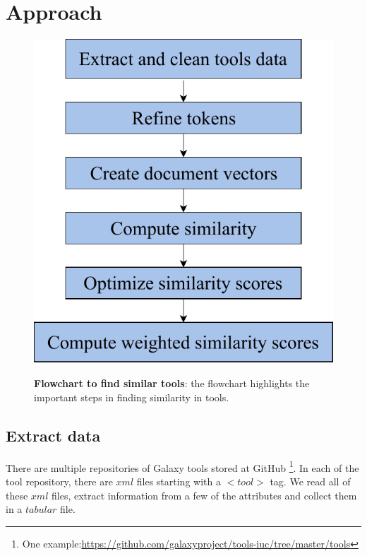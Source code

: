 \chapter{Approach}\label{chap:approach}

\begin{figure}[h]
\begin{centering}
    {\includegraphics[scale=0.7]{figures/tool_sim_flow.pdf}}
    \caption[Tool similarity flowchart]{\textbf{Flowchart to find similar tools}: the flowchart highlights the important steps in finding similarity in tools.}
\end{centering}
\end{figure}

\section{Extract data}    
There are multiple repositories of Galaxy tools stored at GitHub \footnote{One example:\url{https://github.com/galaxyproject/tools-iuc/tree/master/tools}}. In each of the tool repository, there are $xml$ files starting with a $<tool>$ tag. We read all of these $xml$ files, extract information from a few of the attributes and collect them in a $tabular$ file.
    

